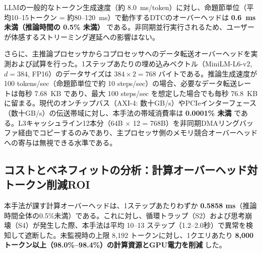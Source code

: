 \documentclass[11pt,a4paper]{article}
\begin{document}
\begin{table}[htbp]
\centering
\caption{DTC v3.0 アルゴリズム処理遅延の実測値（全989ステップ）}
\label{tab:latency}
\small
{}
\end{table}

LLMの一般的なトークン生成速度（約 8.0~ms/token）に対し、命題節単位（平均10--15トークン = 約80--120~ms）で動作するDTCのオーバーヘッドは \textbf{0.6~ms 未満（推論時間の 0.5\% 未満）} である。非同期並行実行されるため、ユーザーが体感するストリーミング遅延への影響はない。

さらに、主推論プロセッサからコプロセッサへのデータ転送オーバーヘッドを実測および試算を行った。1ステップあたりの埋め込みベクトル（MiniLM-L6-v2, $d=384$, FP16）のデータサイズは $384 \times 2 = 768$ バイトである。推論生成速度が 100 tokens/sec（命題節単位で約 10 steps/sec）の場合、必要なデータ転送レートは毎秒 7.68~KB であり、最大 100 steps/sec を想定した場合でも毎秒 76.8~KB に留まる。現代のオンチップバス（AXI-4: 数十GB/s）やPCIeインターフェース（数十GB/s）の伝送帯域に対し、本手法の帯域消費率は \textbf{0.0001\% 未満} である。L3キャッシュライン12本分（64B $\times$ 12 = 768B）を非同期DMAリングバッファ経由でコピーするのみであり、主プロセッサ側のメモリ競合オーバーヘッドへの寄与は無視できる水準である。

\subsection{コストとベネフィットの分析：計算オーバーヘッド対トークン削減ROI}

本手法が課す計算オーバーヘッドは、1ステップあたりわずか \textbf{0.5858 ms}（推論時間全体の0.5\%未満）である。これに対し、循環トラップ（S2）および思考崩壊（S4）が発生した際、本手法は平均 10--13 ステップ（1.2--2.0秒）で異常を検知して遮断した。未監視時の上限 8,192 トークンに対し、1クエリあたり \textbf{8,000 トークン以上（98.0\%--98.4\%）の計算資源とGPU電力を削減} した。
\end{document}

